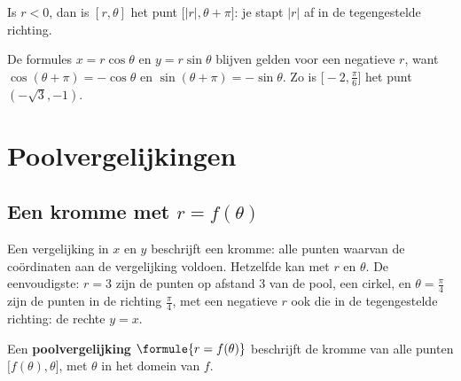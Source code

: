 \begin{theorie}
Is $r < 0$, dan is $[r, \theta]$ het punt $\bigl[|r|, \theta + \pi\bigr]$: je stapt $|r|$ af in de tegengestelde richting.
\end{theorie}


De formules $x = r\cos\theta$ en $y = r\sin\theta$ blijven gelden voor een negatieve $r$, want $\cos(\theta + \pi) = -\cos\theta$ en $\sin(\theta + \pi) = -\sin\theta$. Zo is $\bigl[-2, \tfrac{\pi}{6}\bigr]$ het punt $(-\sqrt3, -1)$.

\begin{oefeningen}
\end{oefeningen}

\section{Poolvergelijkingen}

\subsection{Een kromme met \texorpdfstring{$r = f(\theta)$}{r = f(θ)}}

Een vergelijking in $x$ en $y$ beschrijft een kromme: alle punten waarvan de coördinaten aan de vergelijking voldoen. Hetzelfde kan met $r$ en $\theta$. De eenvoudigste: $r = 3$ zijn de punten op afstand 3 van de pool, een cirkel, en $\theta = \tfrac{\pi}{4}$ zijn de punten in de richting $\tfrac{\pi}{4}$, met een negatieve $r$ ook die in de tegengestelde richting: de rechte $y = x$.

\begin{theorie}
Een \textbf{\textcolor{accent}{poolvergelijking}} $\formule{r = f(\theta)}$ beschrijft de kromme van alle punten $\bigl[f(\theta), \theta\bigr]$, met $\theta$ in het domein van $f$.
\end{theorie}

